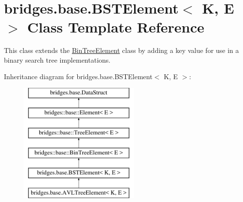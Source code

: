 \hypertarget{classbridges_1_1base_1_1_b_s_t_element}{}\section{bridges.\+base.\+B\+S\+T\+Element$<$ K, E $>$ Class Template Reference}
\label{classbridges_1_1base_1_1_b_s_t_element}


This class extends the \hyperlink{classbridges_1_1base_1_1_bin_tree_element}{Bin\+Tree\+Element} class by adding a \textquotesingle{}key\textquotesingle{} value for use in a binary search tree implementations.  


Inheritance diagram for bridges.\+base.\+B\+S\+T\+Element$<$ K, E $>$\+:\begin{figure}[H]
\begin{center}
\leavevmode
\includegraphics[height=6.000000cm]{classbridges_1_1base_1_1_b_s_t_element}
\end{center}
\end{figure}
